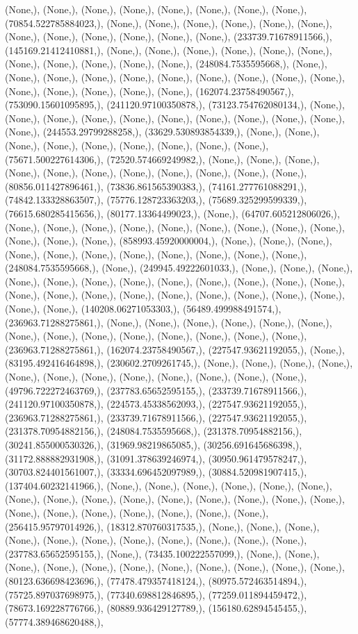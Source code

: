 \documentclass{article}
\begin{document}
(None,), (None,), (None,), (None,), (None,), (None,), (None,), (None,), (70854.522785884023,), (None,), (None,), (None,), (None,), (None,), (None,), (None,), (None,), (None,), (None,), (None,), (None,), (233739.71678911566,), (145169.21412410881,), (None,), (None,), (None,), (None,), (None,), (None,), (None,), (None,), (None,), (None,), (None,), (248084.7535595668,), (None,), (None,), (None,), (None,), (None,), (None,), (None,), (None,), (None,), (None,), (None,), (None,), (None,), (None,), (None,), (162074.23758490567,), (753090.15601095895,), (241120.97100350878,), (73123.754762080134,), (None,), (None,), (None,), (None,), (None,), (None,), (None,), (None,), (None,), (None,), (None,), (244553.29799288258,), (33629.530893854339,), (None,), (None,), (None,), (None,), (None,), (None,), (None,), (None,), (None,), (75671.500227614306,), (72520.574669249982,), (None,), (None,), (None,), (None,), (None,), (None,), (None,), (None,), (None,), (None,), (None,), (80856.011427896461,), (73836.861565390383,), (74161.277761088291,), (74842.133328863507,), (75776.128723363203,), (75689.325299599339,), (76615.680285415656,), (80177.13364499023,), (None,), (64707.605212806026,), (None,), (None,), (None,), (None,), (None,), (None,), (None,), (None,), (None,), (None,), (None,), (None,), (858993.45920000004,), (None,), (None,), (None,), (None,), (None,), (None,), (None,), (None,), (None,), (None,), (None,), (248084.7535595668,), (None,), (249945.49222601033,), (None,), (None,), (None,), (None,), (None,), (None,), (None,), (None,), (None,), (None,), (None,), (None,), (None,), (None,), (None,), (None,), (None,), (None,), (None,), (None,), (None,), (None,), (None,), (140208.06271053303,), (56489.499988491574,), (236963.71288275861,), (None,), (None,), (None,), (None,), (None,), (None,), (None,), (None,), (None,), (None,), (None,), (None,), (None,), (None,), (236963.71288275861,), (162074.23758490567,), (227547.93621192055,), (None,), (83195.492416464898,), (230602.2709261745,), (None,), (None,), (None,), (None,), (None,), (None,), (None,), (None,), (None,), (None,), (None,), (None,), (49796.722272463769,), (237783.65652595155,), (233739.71678911566,), (241120.97100350878,), (224573.45338562093,), (227547.93621192055,), (236963.71288275861,), (233739.71678911566,), (227547.93621192055,), (231378.70954882156,), (248084.7535595668,), (231378.70954882156,), (30241.855000530326,), (31969.98219865085,), (30256.691645686398,), (31172.888882931908,), (31091.378639246974,), (30950.961479578247,), (30703.824401561007,), (33334.696452097989,), (30884.520981907415,), (137404.60232141966,), (None,), (None,), (None,), (None,), (None,), (None,), (None,), (None,), (None,), (None,), (None,), (None,), (None,), (None,), (None,), (None,), (None,), (None,), (None,), (None,), (None,), (None,), (256415.95797014926,), (18312.870760317535,), (None,), (None,), (None,), (None,), (None,), (None,), (None,), (None,), (None,), (None,), (None,), (237783.65652595155,), (None,), (73435.100222557099,), (None,), (None,), (None,), (None,), (None,), (None,), (None,), (None,), (None,), (None,), (None,), (80123.636698423696,), (77478.479357418124,), (80975.572463514894,), (75725.897037698975,), (77340.698812846895,), (77259.011894459472,), (78673.169228776766,), (80889.936429127789,), (156180.62894545455,), (57774.389468620488,), 
\end{document}

